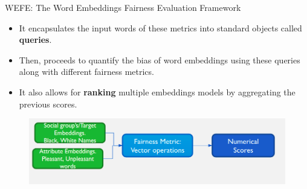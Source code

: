 \documentclass[handout]{beamer}
\begin{document}
\begin{frame}{WEFE: The Word Embeddings Fairness Evaluation Framework}
\begin{scriptsize}
\begin{itemize}

 \item It encapsulates the input words of these metrics into standard objects called \textbf{queries}.
 \item Then, proceeds to quantify the bias of word embeddings using these queries along with different fairness metrics.
 \item It also allows for \textbf{ranking} multiple embeddings models by aggregating the previous scores.
\end{itemize}
  \begin{figure}[h]
        	\includegraphics[scale = 0.3]{pics/wefe.png}
        \end{figure}

\end{scriptsize}
\end{frame}
\end{document}
